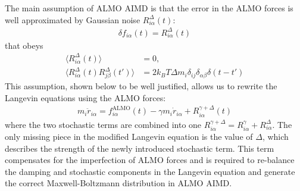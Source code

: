 \documentclass[aps,prl,reprint,amsmath,amssymb]{revtex4-1}
\begin{document}

The main assumption of ALMO AIMD is that the error in the ALMO forces is well approximated by Gaussian noise $R^{\Delta}_{i\alpha} (t)$:
%
\begin{align}
\label{eq:assumption}
\delta f_{i\alpha}(t) = R^{\Delta}_{i\alpha} (t)
\end{align}
%
that obeys
%
\begin{align}
\label{eq:stochastic2}
\langle R^{\Delta}_{i\alpha} (t) \rangle &= 0, \\
\label{eq:stochastic3}
\langle R^{\Delta}_{i\alpha} (t)  R^{\Delta}_{j\beta} (t') \rangle &= 2 k_B T \Delta m_i \delta_{ij} \delta_{\alpha\beta} \delta(t-t')
\end{align}
%
This assumption, shown below to be well justified, allows us to rewrite the Langevin equations using the ALMO forces:
%
\begin{align}
\label{eq:langevin2}
m_i \ddot{r}_{i\alpha} = f^{\text{ALMO}}_{i\alpha}(t) - \gamma m_i \dot{r}_{i\alpha} + R^{\gamma + \Delta}_{i\alpha} (t)
\end{align}
%
where the two stochastic terms are combined into one $R^{\gamma + \Delta}_{i\alpha} = R^{\gamma}_{i\alpha} + R^{\Delta}_{i\alpha}$. 
The only missing piece in the modified Langevin equation is the value of $\Delta$, which describes the strength of the newly introduced stochastic term. 
This term compensates for the imperfection of ALMO forces and is required to re-balance the damping and stochastic components in the Langevin equation and generate the correct Maxwell-Boltzmann distribution in ALMO AIMD. 

\end{document}
